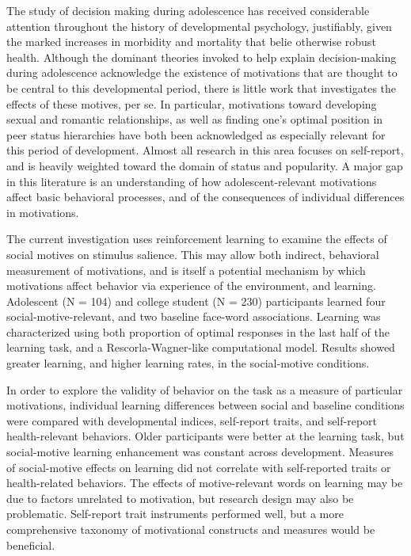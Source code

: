 The study of decision making during adolescence has received considerable attention throughout the history of developmental psychology, justifiably, given the marked increases in morbidity and mortality that belie otherwise robust health.
Although the dominant theories invoked to help explain decision-making during adolescence acknowledge the existence of motivations that are thought to be central to this developmental period, there is little work that investigates the effects of these motives, per se.
In particular, motivations toward developing sexual and romantic relationships, as well as finding one's optimal position in peer status hierarchies have both been acknowledged as especially relevant for this period of development.
Almost all research in this area focuses on self-report, and is heavily weighted toward the domain of status and popularity.
A major gap in this literature is an understanding of how adolescent-relevant motivations affect basic behavioral processes, and of the consequences of individual differences in motivations.

The current investigation uses reinforcement learning to examine the effects of social motives on stimulus salience. 
This may allow both indirect, behavioral measurement of motivations, and is itself a potential mechanism by which motivations affect behavior via experience of the environment, and learning.
Adolescent (N = 104) and college student (N = 230) participants learned four social-motive-relevant, and two baseline face-word associations.
Learning was characterized using both proportion of optimal responses in the last half of the learning task, and a Rescorla-Wagner-like computational model.
Results showed greater learning, and higher learning rates, in the social-motive conditions.

In order to explore the validity of behavior on the task as a measure of particular motivations, individual learning differences  between social and baseline conditions were compared with developmental indices, self-report traits, and self-report health-relevant behaviors.
Older participants were better at the learning task, but social-motive learning enhancement was constant across development.
Measures of social-motive effects on learning did not correlate with self-reported traits or health-related behaviors.
The effects of motive-relevant words on learning may be due to factors unrelated to motivation, but research design may also be problematic.
Self-report trait instruments performed well, but a more comprehensive taxonomy of motivational constructs and measures would be beneficial.
